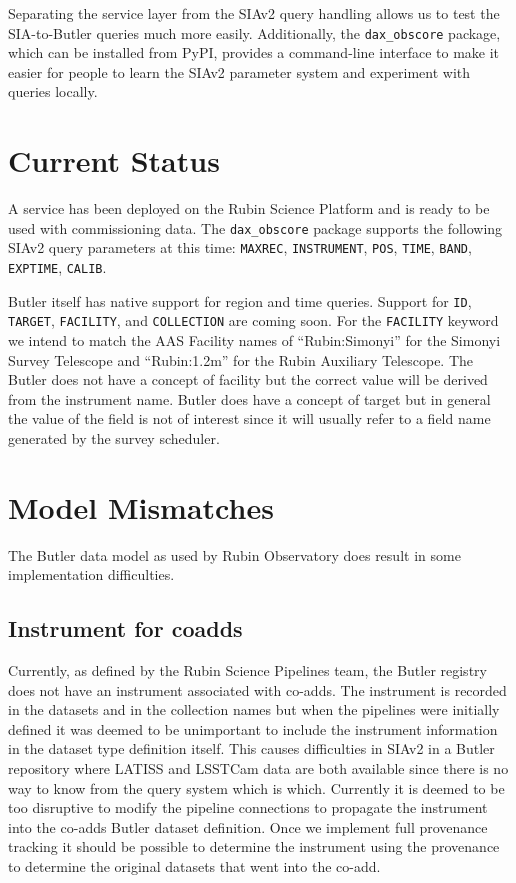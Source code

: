\documentclass[11pt,twoside]{article}
\begin{document}
Separating the service layer from the SIAv2 query handling allows us to test the SIA-to-Butler queries much more easily.
Additionally, the \texttt{dax\_obscore} package, which can be installed from PyPI, provides a command-line interface to make it easier for people to learn the SIAv2 parameter system and experiment with queries locally.

\section{Current Status}

A service has been deployed on the Rubin Science Platform and is ready to be used with commissioning data.
The \texttt{dax\_obscore} package supports the following SIAv2 query parameters at this time:
\texttt{MAXREC},
\texttt{INSTRUMENT},
\texttt{POS},
\texttt{TIME},
\texttt{BAND},
\texttt{EXPTIME},
\texttt{CALIB}.

Butler itself has native support for region and time queries.
Support for
\texttt{ID},
\texttt{TARGET},
\texttt{FACILITY},
and \texttt{COLLECTION} are coming soon.
For the \texttt{FACILITY} keyword we intend to match the AAS Facility names of ``Rubin:Simonyi'' for the Simonyi Survey Telescope and ``Rubin:1.2m'' for the Rubin Auxiliary Telescope.
The Butler does not have a concept of facility but the correct value will be derived from the instrument name.
Butler does have a concept of target but in general the value of the field is not of interest since it will usually refer to a field name generated by the survey scheduler.

\section{Model Mismatches}

The Butler data model as used by Rubin Observatory does result in some implementation difficulties.

\subsection{Instrument for coadds}

Currently, as defined by the Rubin Science Pipelines team, the Butler registry does not have an instrument associated with co-adds.
The instrument is recorded in the datasets and in the collection names but when the pipelines were initially defined it was deemed to be unimportant to include the instrument information in the dataset type definition itself.
This causes difficulties in SIAv2 in a Butler repository where LATISS and LSSTCam data are both available since there is no way to know from the query system which is which.
Currently it is deemed to be too disruptive to modify the pipeline connections to propagate the instrument into the co-adds Butler dataset definition.
Once we implement full provenance tracking it should be possible to determine the instrument using the provenance to determine the original datasets that went into the co-add.
\end{document}
